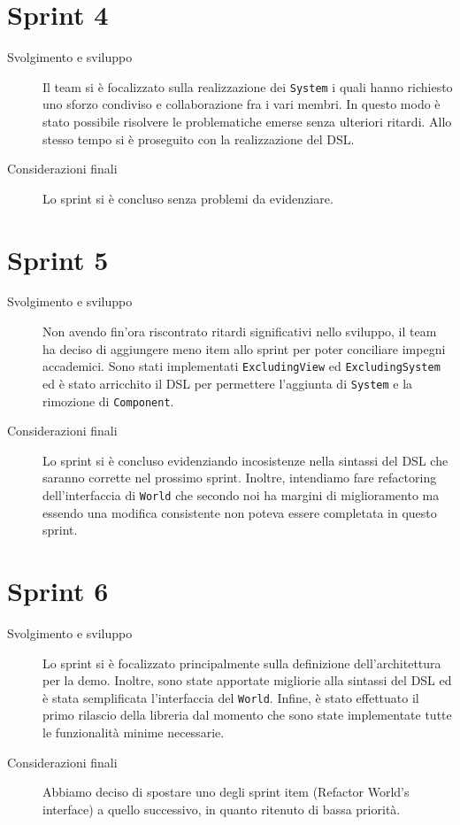 \section{Sprint 4}\label{sec:sprint-4}
\begin{description}
    \item[Svolgimento e sviluppo] Il team si è focalizzato sulla realizzazione dei \texttt{System} i quali hanno richiesto uno sforzo condiviso e collaborazione fra i vari membri.
    In questo modo
    è stato possibile risolvere le problematiche emerse senza ulteriori ritardi.
    Allo stesso tempo si è proseguito con la realizzazione del DSL\@.
    \item[Considerazioni finali] Lo sprint si è concluso senza problemi da evidenziare.
\end{description}
\section{Sprint 5}\label{sec:sprint-5}
\begin{description}
    \item[Svolgimento e sviluppo] Non avendo fin'ora riscontrato ritardi significativi nello sviluppo, il team ha deciso di aggiungere meno item allo sprint per poter conciliare impegni accademici.
    Sono stati implementati \texttt{ExcludingView} ed \texttt{ExcludingSystem} ed è stato arricchito il DSL per permettere l'aggiunta di \texttt{System} e la rimozione di \texttt{Component}.
    \item[Considerazioni finali] Lo sprint si è concluso evidenziando incosistenze nella sintassi del DSL che saranno corrette nel prossimo sprint.
    Inoltre, intendiamo fare refactoring dell'interfaccia di \texttt{World} che secondo noi ha margini di miglioramento ma essendo una modifica consistente non poteva essere completata in questo sprint.
\end{description}
\section{Sprint 6}\label{sec:sprint-6}
\begin{description}
    \item[Svolgimento e sviluppo] Lo sprint si è focalizzato principalmente sulla definizione dell'architettura per la demo.
    Inoltre, sono state apportate migliorie alla sintassi del DSL ed è stata semplificata l'interfaccia del \texttt{World}.
    Infine, è stato effettuato il primo rilascio della libreria dal momento che sono state implementate tutte le funzionalità minime necessarie.
    \item[Considerazioni finali] Abbiamo deciso di spostare uno degli sprint item (Refactor World's interface) a quello successivo, in quanto ritenuto di bassa priorità.
\end{description}
